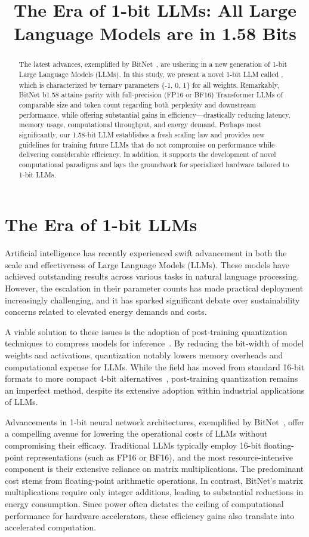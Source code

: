 \title{The Era of 1-bit LLMs: All Large Language Models are in 1.58 Bits}

\begin{abstract}
The latest advances, exemplified by BitNet~\cite{bitnet}, are ushering in a new generation of 1-bit Large Language Models (LLMs). In this study, we present a novel 1-bit LLM called \textbf{}, which is characterized by ternary parameters \{-1, 0, 1\} for all weights. Remarkably, BitNet b1.58 attains parity with full-precision (FP16 or BF16) Transformer LLMs of comparable size and token count regarding both perplexity and downstream performance, while offering substantial gains in efficiency—drastically reducing latency, memory usage, computational throughput, and energy demand. Perhaps most significantly, our 1.58-bit LLM establishes a fresh scaling law and provides new guidelines for training future LLMs that do not compromise on performance while delivering considerable efficiency. In addition, it supports the development of novel computational paradigms and lays the groundwork for specialized hardware tailored to 1-bit LLMs.
\end{abstract}

\section{The Era of 1-bit LLMs}

Artificial intelligence has recently experienced swift advancement in both the scale and effectiveness of Large Language Models (LLMs). These models have achieved outstanding results across various tasks in natural language processing. However, the escalation in their parameter counts has made practical deployment increasingly challenging, and it has sparked significant debate over sustainability concerns related to elevated energy demands and costs.

A viable solution to these issues is the adoption of post-training quantization techniques to compress models for inference~\cite{smoothquant, gptq, quip, quip_sharp}. By reducing the bit-width of model weights and activations, quantization notably lowers memory overheads and computational expense for LLMs. While the field has moved from standard 16-bit formats to more compact 4-bit alternatives~\cite{gptq, awq}, post-training quantization remains an imperfect method, despite its extensive adoption within industrial applications of LLMs.

Advancements in 1-bit neural network architectures, exemplified by BitNet~\cite{bitnet}, offer a compelling avenue for lowering the operational costs of LLMs without compromising their efficacy. Traditional LLMs typically employ 16-bit floating-point representations (such as FP16 or BF16), and the most resource-intensive component is their extensive reliance on matrix multiplications. The predominant cost stems from floating-point arithmetic operations. In contrast, BitNet's matrix multiplications require only integer additions, leading to substantial reductions in energy consumption. Since power often dictates the ceiling of computational performance for hardware accelerators, these efficiency gains also translate into accelerated computation.

